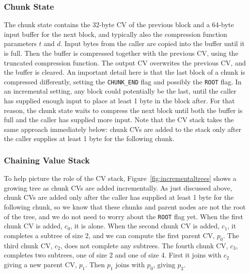 \documentclass[11pt,notitlepage,a4paper]{article}
\begin{document}
\subsubsection{Chunk State}\label{sec:chunkstate}

The chunk state contains the 32-byte CV of the previous block and a 64-byte
input buffer for the next block, and typically also the compression function
parameters $t$ and $d$. Input bytes from the caller are copied into the buffer
until it is full. Then the buffer is compressed together with the previous CV,
using the truncated compression function. The output CV overwrites the previous
CV, and the buffer is cleared. An important detail here is that the last block
of a chunk is compressed differently, setting the \texttt{CHUNK\_END} flag and
possibly the \texttt{ROOT} flag. In an incremental setting, any block could
potentially be the last, until the caller has supplied enough input to place at
least 1 byte in the block after. For that reason, the chunk state waits to
compress the next block until both the buffer is full and the caller has
supplied more input. Note that the CV stack takes the same approach immediately
below: chunk CVs are added to the stack only after the caller supplies at least
1 byte for the following chunk.

\subsubsection{Chaining Value Stack}\label{sec:cvstack}

To help picture the role of the CV stack, Figure~\ref{fig:incrementaltrees}
shows a growing tree as chunk CVs are added incrementally. As just discussed
above, chunk CVs are added only after the caller has supplied at least 1 byte
for the following chunk, so we know that these chunks and parent nodes are not
the root of the tree, and we do not need to worry about the \texttt{ROOT} flag
yet. When the first chunk CV is added, $c_0$, it is alone. When the second
chunk CV is added, $c_1$, it completes a subtree of size 2, and we can compute
the first parent CV, $p_0$. The third chunk CV, $c_2$, does not complete any
subtrees. The fourth chunk CV, $c_3$, completes two subtrees, one of size 2 and
one of size 4. First it joins with $c_2$ giving a new parent CV, $p_1$. Then
$p_1$ joins with $p_0$, giving $p_2$.
\end{document}

